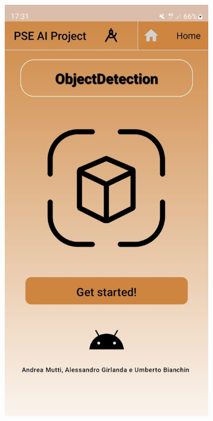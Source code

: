 \begin{figure}[H]
  \centering
  \begin{subfigure}[b]{0.3\textwidth}
    \includegraphics[width=\textwidth, height=0.4\textheight]{Immagini/App/home_chiaro.jpeg}

\end{subfigure}
\end{figure}
